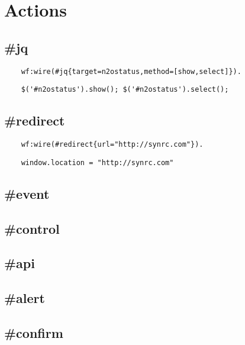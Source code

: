 \section{Actions}

\subsection{\#jq}

\vspace{1\baselineskip}
\begin{lstlisting}
    wf:wire(#jq{target=n2ostatus,method=[show,select]}).
\end{lstlisting}
\vspace{1\baselineskip}

\vspace{1\baselineskip}
\begin{lstlisting}
    $('#n2ostatus').show(); $('#n2ostatus').select();
\end{lstlisting}
\vspace{1\baselineskip}

\subsection{\#redirect}
\vspace{1\baselineskip}
\begin{lstlisting}
    wf:wire(#redirect{url="http://synrc.com"}).
\end{lstlisting}
\vspace{1\baselineskip}

\vspace{1\baselineskip}
\begin{lstlisting}
    window.location = "http://synrc.com"
\end{lstlisting}
\vspace{1\baselineskip}

\subsection{\#event}

\subsection{\#control}

\subsection{\#api}

\subsection{\#alert}

\subsection{\#confirm}


